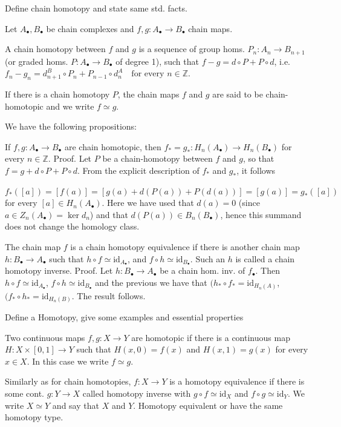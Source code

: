 Define chain homotopy and state same std. facts.

Let \( A_\bullet, B_\bullet \) be chain complexes and \( f,g : A_\bullet \to B_\bullet \) chain maps.

A chain homotopy between \( f \) and \( g \) is a sequence of group homs. \( P_n : A_n \to B_{n+1} \)
(or graded homs. \( P : A_\bullet \to B_\bullet \) of degree 1),
such that \(f - g = d \circ P + P \circ d\), i.e. 
\(f_n - g_n = d^B_{n+1} \circ P_n + P_{n-1} \circ d^A_n \quad \text{for every } n \in \mathbb{Z}.\)

If there is a chain homotopy \(P\), the chain maps \(f\) and \(g\) are said to be chain-homotopic and we write \(f \simeq g\).

We have the following propositions:

If \( f, g : A_\bullet \to B_\bullet \) are chain homotopic, then \( f_{\ast} = g_{\ast} : H_n(A_\bullet) \to H_n(B_{\bullet})\)
for every \( n \in \mathbb{Z} \).
Proof. 
Let \(P\) be a chain-homotopy between \(f\) and \(g\), so that \(f = g + d \circ P + P \circ d\). From the explicit description of \(f_*\) and \(g_*\), it follows

\(f_*([a]) = [f(a)] = [g(a) + d(P(a)) + P(d(a))] = [g(a)] = g_*([a])\)
for every \([a] \in H_n(A_\bullet)\). Here we have used that \(d(a) = 0\) (since \(a \in Z_n(A_\bullet) = \ker d_n\)) and that \(d(P(a)) \in B_n(B_\bullet)\), hence this summand does not change the homology class.


The chain map \(f\) is a chain homotopy equivalence if there is another chain map \(h: B_\bullet \to A_\bullet\) such that \(h \circ f \simeq \text{id}_{A_\bullet}\), 
and \(f \circ h \simeq \text{id}_{B_\bullet}\). Such an \(h\) is called a chain homotopy inverse.
Proof.
Let \( h : B_\bullet \to A_\bullet \) be a chain hom. inv. of \( f_{\bullet} \). Then \( h \circ f \simeq \text{id}_{A_{\bullet}} \), \( f \circ h \simeq \text{id}_{B_{\bullet}} \) and the previous we have that \( (h_\ast \circ f_{\ast} = \text{id}_{H_n(A)} \), \( (f_\ast \circ h_{\ast} = \text{id}_{H_n(B)} \). The result follows.


Define a Homotopy, give some examples and essential properties

Two continuous maps \( f, g : X \to Y \) are homotopic if there is a continuous map
\( H : X \times [0, 1] \to Y \) such that \( H(x, 0) = f(x) \) and \(H(x, 1) = g(x)\) for every \( x \in X \). 
In this case we write \( f \simeq g \).

Similarly as for chain homotopies, \( f : X \to Y \) is a homotopy equivalence if there is some cont. \( g : Y \to X \)
called homotopy inverse with \( g \circ f \simeq \text{id}_X \) and \( f \circ g \simeq \text{id}_{Y} \).
We write \( X \simeq Y \) and say that \( X \) and \( Y \). Homotopy equivalent or have the
same homotopy type.

